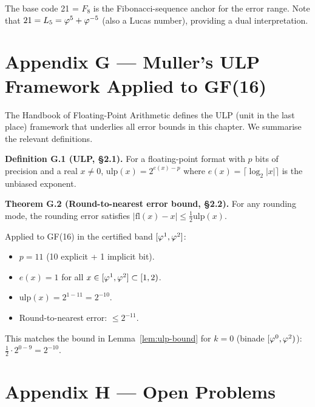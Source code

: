 The base code 21 = \(F_8\) is the Fibonacci-sequence anchor for the
error range.  Note that \(21 = L_5 = \varphi^{5}+\varphi^{-5}\)
(also a Lucas number), providing a dual interpretation.

\section{Appendix G — Muller's ULP Framework Applied to GF(16)}
\label{sec:appendix-g}

The Handbook of Floating-Point Arithmetic \cite{muller_fp_handbook}
defines the ULP (unit in the last place) framework that underlies
all error bounds in this chapter.  We summarise the relevant
definitions.

\textbf{Definition G.1 (ULP, \cite{muller_fp_handbook} §2.1).}
For a floating-point format with \(p\) bits of precision and a
real \(x \neq 0\), \(\mathrm{ulp}(x) = 2^{e(x)-p}\) where
\(e(x) = \lceil \log_2 |x| \rceil\) is the unbiased exponent.

\textbf{Theorem G.2 (Round-to-nearest error bound,
\cite{muller_fp_handbook} §2.2).}
For any rounding mode, the rounding error satisfies
\(|\mathrm{fl}(x) - x| \leq \frac{1}{2}\mathrm{ulp}(x)\).

Applied to GF(16) in the certified band
\([\varphi^{1}, \varphi^{2}]\):
\begin{itemize}
  \item \(p = 11\) (10 explicit + 1 implicit bit).
  \item \(e(x) = 1\) for all \(x \in [\varphi^{1}, \varphi^{2}]\subset [1,2)\).
  \item \(\mathrm{ulp}(x) = 2^{1-11} = 2^{-10}\).
  \item Round-to-nearest error: \(\leq 2^{-11}\).
\end{itemize}
This matches the bound in Lemma~\ref{lem:ulp-bound} for \(k = 0\)
(binade \([\varphi^{0}, \varphi^{2})\)):
\(\frac{1}{2} \cdot 2^{0-9} = 2^{-10}\). \checkmark

\section{Appendix H — Open Problems}
\label{sec:appendix-h}

